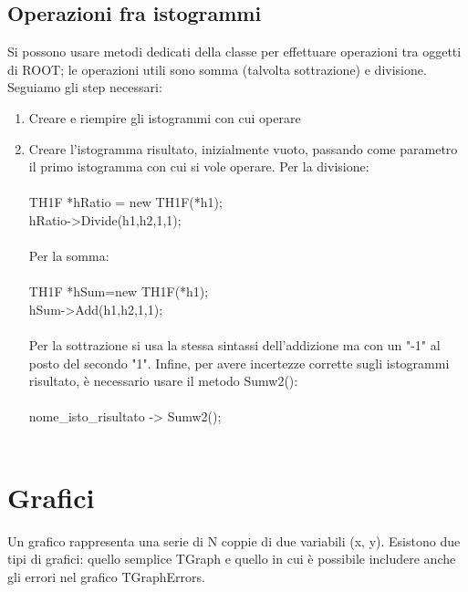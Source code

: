 \documentclass[10pt,a4paper]{article}
\begin{document}
\subsection{Operazioni fra istogrammi}
Si possono usare metodi dedicati della classe per effettuare operazioni tra oggetti di ROOT; le operazioni utili sono somma (talvolta sottrazione) e divisione. Seguiamo gli step necessari:
\begin{enumerate}
	\item Creare e riempire gli istogrammi con cui operare
	\item Creare l'istogramma risultato, inizialmente vuoto, passando come parametro il primo istogramma con cui si vole operare. Per la divisione:\\\\
	TH1F *hRatio = new TH1F(*h1);\\
	hRatio->Divide(h1,h2,1,1);\\\\
	Per la somma:\\\\
	TH1F *hSum=new TH1F(*h1);\\
	hSum->Add(h1,h2,1,1);\\\\
	Per la sottrazione si usa la stessa sintassi dell'addizione ma con un "-1" al posto del secondo "1". Infine, per avere incertezze corrette sugli istogrammi risultato, è necessario usare il metodo Sumw2():\\\\
	nome\_isto\_risultato -> Sumw2();\\\\
\end{enumerate}
\section{Grafici}
Un grafico rappresenta una serie di N coppie di due variabili (x, y). Esistono due tipi di grafici: quello semplice TGraph e quello in cui è possibile includere anche gli errori nel grafico TGraphErrors. 
\end{document}
